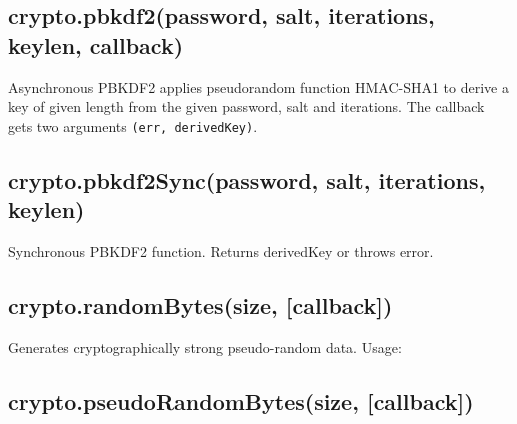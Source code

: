 \subsection{crypto.pbkdf2(password, salt, iterations, keylen, callback)}

Asynchronous PBKDF2 applies pseudorandom function HMAC-SHA1 to derive a
key of given length from the given password, salt and iterations. The
callback gets two arguments \texttt{(err, derivedKey)}.

\subsection{crypto.pbkdf2Sync(password, salt, iterations, keylen)}

Synchronous PBKDF2 function. Returns derivedKey or throws error.

\subsection{crypto.randomBytes(size, {[}callback{]})}

Generates cryptographically strong pseudo-random data. Usage:

\begin{Shaded}
\end{Shaded}

\subsection{crypto.pseudoRandomBytes(size, {[}callback{]})}

